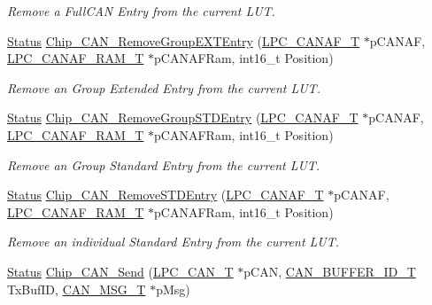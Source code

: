 \begin{DoxyCompactItemize}
\begin{DoxyCompactList}\small\item\em Remove a Full\+C\+AN Entry from the current L\+UT. \end{DoxyCompactList}\item 
\hyperlink{group__LPC__Types__Public__Types_ga67a0db04d321a74b7e7fcfd3f1a3f70b}{Status} \hyperlink{group__CAN__17XX__40XX_gafa0a59577a1c1d38c4c6a339d018c35d}{Chip\+\_\+\+C\+A\+N\+\_\+\+Remove\+Group\+E\+X\+T\+Entry} (\hyperlink{structLPC__CANAF__T}{L\+P\+C\+\_\+\+C\+A\+N\+A\+F\+\_\+T} $\ast$p\+C\+A\+N\+AF, \hyperlink{structLPC__CANAF__RAM__T}{L\+P\+C\+\_\+\+C\+A\+N\+A\+F\+\_\+\+R\+A\+M\+\_\+T} $\ast$p\+C\+A\+N\+A\+F\+Ram, int16\+\_\+t Position)
\begin{DoxyCompactList}\small\item\em Remove an Group Extended Entry from the current L\+UT. \end{DoxyCompactList}\item 
\hyperlink{group__LPC__Types__Public__Types_ga67a0db04d321a74b7e7fcfd3f1a3f70b}{Status} \hyperlink{group__CAN__17XX__40XX_ga090e4a29bbaebc8de77bc929438dcfb7}{Chip\+\_\+\+C\+A\+N\+\_\+\+Remove\+Group\+S\+T\+D\+Entry} (\hyperlink{structLPC__CANAF__T}{L\+P\+C\+\_\+\+C\+A\+N\+A\+F\+\_\+T} $\ast$p\+C\+A\+N\+AF, \hyperlink{structLPC__CANAF__RAM__T}{L\+P\+C\+\_\+\+C\+A\+N\+A\+F\+\_\+\+R\+A\+M\+\_\+T} $\ast$p\+C\+A\+N\+A\+F\+Ram, int16\+\_\+t Position)
\begin{DoxyCompactList}\small\item\em Remove an Group Standard Entry from the current L\+UT. \end{DoxyCompactList}\item 
\hyperlink{group__LPC__Types__Public__Types_ga67a0db04d321a74b7e7fcfd3f1a3f70b}{Status} \hyperlink{group__CAN__17XX__40XX_gac991bc7a590c7069e4149a0b8ccfcb55}{Chip\+\_\+\+C\+A\+N\+\_\+\+Remove\+S\+T\+D\+Entry} (\hyperlink{structLPC__CANAF__T}{L\+P\+C\+\_\+\+C\+A\+N\+A\+F\+\_\+T} $\ast$p\+C\+A\+N\+AF, \hyperlink{structLPC__CANAF__RAM__T}{L\+P\+C\+\_\+\+C\+A\+N\+A\+F\+\_\+\+R\+A\+M\+\_\+T} $\ast$p\+C\+A\+N\+A\+F\+Ram, int16\+\_\+t Position)
\begin{DoxyCompactList}\small\item\em Remove an individual Standard Entry from the current L\+UT. \end{DoxyCompactList}\item 
\hyperlink{group__LPC__Types__Public__Types_ga67a0db04d321a74b7e7fcfd3f1a3f70b}{Status} \hyperlink{group__CAN__17XX__40XX_ga27767c0aa2e0c5da0e680e7e432bbc69}{Chip\+\_\+\+C\+A\+N\+\_\+\+Send} (\hyperlink{structLPC__CAN__T}{L\+P\+C\+\_\+\+C\+A\+N\+\_\+T} $\ast$p\+C\+AN, \hyperlink{group__CAN__17XX__40XX_ga073d4792bdf9dd0d8ceda6b8c3752dd9}{C\+A\+N\+\_\+\+B\+U\+F\+F\+E\+R\+\_\+\+I\+D\+\_\+T} Tx\+Buf\+ID, \hyperlink{structCAN__MSG__T}{C\+A\+N\+\_\+\+M\+S\+G\+\_\+T} $\ast$p\+Msg)

\end{DoxyCompactItemize}
